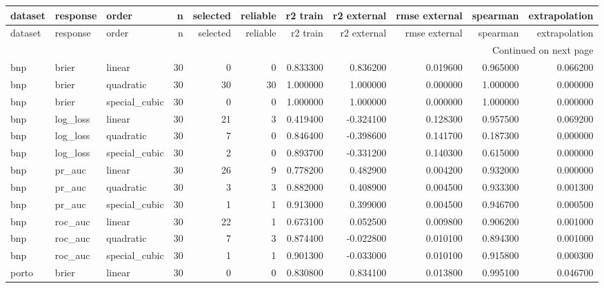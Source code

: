 \begin{center}\label{tab:s3orders}\end{center}
\begingroup\tiny\setlength{\tabcolsep}{2.5pt}
\begin{longtable}{lllrrrrrrrr}
\toprule
dataset & response & order & n & selected & reliable & r2 train & r2 external & rmse external & spearman & extrapolation \\
\midrule
\endfirsthead
\toprule
dataset & response & order & n & selected & reliable & r2 train & r2 external & rmse external & spearman & extrapolation \\
\midrule
\endhead
\midrule
\multicolumn{11}{r}{Continued on next page} \\
\midrule
\endfoot
\bottomrule
\endlastfoot
bnp & brier & linear & 30 & 0 & 0 & 0.833300 & 0.836200 & 0.019600 & 0.965000 & 0.066200 \\
bnp & brier & quadratic & 30 & 30 & 30 & 1.000000 & 1.000000 & 0.000000 & 1.000000 & 0.000000 \\
bnp & brier & special\_cubic & 30 & 0 & 0 & 1.000000 & 1.000000 & 0.000000 & 1.000000 & 0.000000 \\
bnp & log\_loss & linear & 30 & 21 & 3 & 0.419400 & -0.324100 & 0.128300 & 0.957500 & 0.069200 \\
bnp & log\_loss & quadratic & 30 & 7 & 0 & 0.846400 & -0.398600 & 0.141700 & 0.187300 & 0.000000 \\
bnp & log\_loss & special\_cubic & 30 & 2 & 0 & 0.893700 & -0.331200 & 0.140300 & 0.615000 & 0.000000 \\
bnp & pr\_auc & linear & 30 & 26 & 9 & 0.778200 & 0.482900 & 0.004200 & 0.932000 & 0.000000 \\
bnp & pr\_auc & quadratic & 30 & 3 & 3 & 0.882000 & 0.408900 & 0.004500 & 0.933300 & 0.001300 \\
bnp & pr\_auc & special\_cubic & 30 & 1 & 1 & 0.913000 & 0.399000 & 0.004500 & 0.946700 & 0.000500 \\
bnp & roc\_auc & linear & 30 & 22 & 1 & 0.673100 & 0.052500 & 0.009800 & 0.906200 & 0.001000 \\
bnp & roc\_auc & quadratic & 30 & 7 & 3 & 0.874400 & -0.022800 & 0.010100 & 0.894300 & 0.001000 \\
bnp & roc\_auc & special\_cubic & 30 & 1 & 1 & 0.901300 & -0.033000 & 0.010100 & 0.915800 & 0.000300 \\
porto & brier & linear & 30 & 0 & 0 & 0.830800 & 0.834100 & 0.013800 & 0.995100 & 0.046700 \\

\end{longtable}
